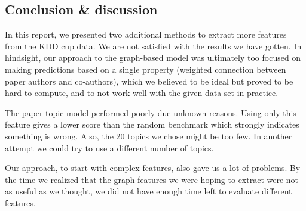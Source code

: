 \subsection{Conclusion \& discussion}

In this report, we presented two additional methods to extract more features from the KDD cup data. We are not satisfied with the results we have gotten. In hindsight, our approach to the graph-based model was ultimately too focused on making predictions based on a single property (weighted connection between paper authors and co-authors), which we believed to be ideal but proved to be hard to compute, and to not work well with the given data set in practice. 

The paper-topic model performed poorly due unknown reasons. Using only this feature gives a lower score than the random benchmark which strongly indicates something is wrong. Also, the 20 topics we chose might be too few. In another attempt we could try to use a different number of topics. 

Our approach, to start with complex features, also gave us a lot of problems.
By the time we realized that the graph features we were hoping to extract were not as useful as we thought, we did not have enough time left to evaluate different features.



